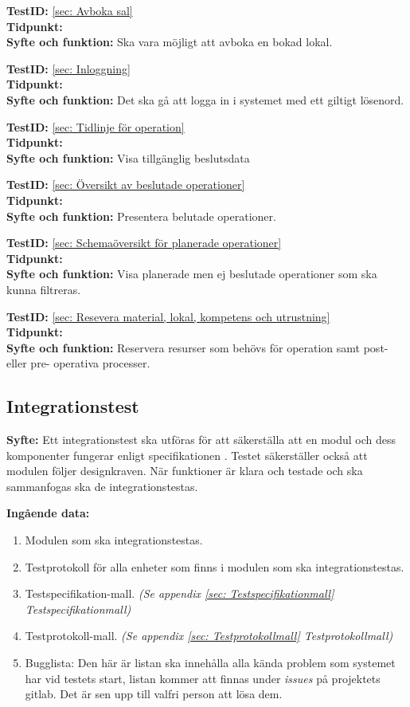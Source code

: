 \documentclass[a4paper,10pt, twoside]{article}
\begin{document}
  \textbf{TestID:} \ref{sec: Avboka sal} 
  \\ \textbf{Tidpunkt:}
  \\ \textbf{Syfte och funktion:} Ska vara möjligt att avboka en bokad lokal.
  
  \textbf{TestID:} \ref{sec: Inloggning} 
  \\ \textbf{Tidpunkt:}  
  \\ \textbf{Syfte och funktion:} Det ska gå att logga in i systemet med ett giltigt lösenord.
  
  \textbf{TestID:} \ref{sec: Tidlinje för operation} 
  \\ \textbf{Tidpunkt:}
  \\ \textbf{Syfte och funktion:} Visa tillgänglig beslutsdata

  \textbf{TestID:} \ref{sec: Översikt av beslutade operationer} 
  \\ \textbf{Tidpunkt:}  
  \\ \textbf{Syfte och funktion:} Presentera belutade operationer.

  \textbf{TestID:} \ref{sec: Schemaöversikt för planerade operationer} 
  \\ \textbf{Tidpunkt:}  
  \\ \textbf{Syfte och funktion:} Visa planerade men ej beslutade operationer som ska kunna filtreras.
  
  \textbf{TestID:} \ref{sec: Resevera material, lokal, kompetens och utrustning} 
  \\ \textbf{Tidpunkt:}
  \\ \textbf{Syfte och funktion:} Reservera resurser som behövs för operation samt post- eller pre-					operativa processer.

\subsection{Integrationstest}
\label{sec:Integrationstest}
\textbf{Syfte:} Ett integrationstest ska utföras för att säkerställa att en modul och dess komponenter fungerar enligt specifikationen \cite{kravspec}. Testet säkerställer också att modulen följer designkraven. När funktioner är klara och testade och ska sammanfogas ska de integrationstestas.

\textbf{Ingående data:}
\begin{enumerate}
	\item Modulen som ska integrationstestas.
    \item Testprotokoll för alla enheter som finns i modulen som ska integrationstestas.
    \item Testspecifikation-mall. \emph{(Se appendix \ref{sec: Testspecifikationmall} 				{Testspecifikationmall})}
    \item Testprotokoll-mall. \emph{(Se appendix \ref{sec: Testprotokollmall} Testprotokollmall)}
    \item Bugglista: Den här är listan ska innehålla alla kända problem som systemet har vid testets 			  start, listan kommer att finnas under \emph{issues} på projektets gitlab. Det är sen upp    			  till valfri person att lösa dem.
\end{enumerate}
\end{document}
